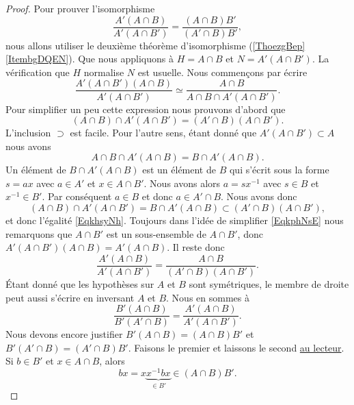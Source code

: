 \begin{proof}
    Pour prouver l'isomorphisme
    \begin{equation}
        \frac{ A'(A\cap B) }{ A'(A\cap B') }=\frac{ (A\cap B)B' }{ (A'\cap B)B' },
    \end{equation}
    nous allons utiliser le deuxième théorème d'isomorphisme (\ref{ThoezgBep}\ref{ItembgDQEN}). Que nous appliquons à \( H=A\cap B\) et \( N=A'(A\cap B')\). La vérification que \( H\) normalise \( N\) est usuelle. Nous commençons par écrire
    \begin{equation}    \label{EqkphNsE}
        \frac{ A'(A\cap B')(A\cap B) }{ A'(A\cap B') }\simeq\frac{ A\cap B }{ A\cap B\cap A'(A\cap B') }.
    \end{equation}
    Pour simplifier un peu cette expression nous prouvons d'abord que
    \begin{equation}    \label{EqkhsyNh}
        (A\cap B)\cap A'(A\cap B')=(A'\cap B)(A\cap B').
    \end{equation}
    L'inclusion \( \supset\) est facile. Pour l'autre sens, étant donné que \( A'(A\cap B')\subset A\) nous avons
    \begin{equation}
        A\cap B\cap A'(A\cap B)=B\cap A'(A\cap B).
    \end{equation}
    Un élément de \( B\cap A'(A\cap B)\) est un élément de \(   B\) qui s'écrit sous la forme \( s=ax\) avec \( a\in A'\) et \( x\in A\cap B'\). Nous avons alors \( a=sx^{-1}\) avec \( s\in B\) et \( x^{-1} \in B'\). Par conséquent \( a\in B\) et donc \( a\in A'\cap B\). Nous avons donc
    \begin{equation}
        (A\cap B)\cap A'(A\cap B')=B\cap A'(A\cap B)\subset (A'\cap B)(A\cap B'),
    \end{equation}
    et donc l'égalité \eqref{EqkhsyNh}. Toujours dans l'idée de simplifier \eqref{EqkphNsE} nous remarquons que \( A\cap B'\) est un sous-ensemble de \( A\cap B'\), donc \( A'(A\cap B')(A\cap B)=A'(A\cap B)\). Il reste donc
    \begin{equation}
        \frac{ A'(A\cap B) }{ A'(A\cap B') }=\frac{ A\cap B }{ (A'\cap B)(A\cap B') }.
    \end{equation}
    Étant donné que les hypothèses sur \( A\) et \( B\) sont symétriques, le membre de droite peut aussi s'écrire en inversant \( A\) et \( B\). Nous en sommes à
    \begin{equation}
        \frac{ B'(A\cap B) }{ B'(A'\cap B) }=\frac{ A'(A\cap B) }{ A'(A\cap B') }.
    \end{equation}
    Nous devons encore justifier \( B'(A\cap B)=(A\cap B)B'\) et \( B'(A'\cap B)=(A'\cap B)B'\). Faisons le premier et laissons le second \href{http://abstrusegoose.com/395}{au lecteur}.
    Si \( b\in B'\) et \( x\in A\cap B\), alors
    \begin{equation}
        bx=x\underbrace{x^{-1}bx}_{\in B'}\in (A\cap B)B'.
    \end{equation}
\end{proof}

